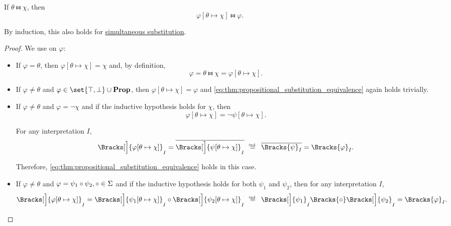 \begin{proposition}\label{thm:propositional_substitution_equivalence}
  If \( \theta \gleichstark \chi \), then
  \begin{equation}\label{eq:thm:propositional_substitution_equivalence}
    \varphi[\theta \mapsto \chi] \gleichstark \varphi.
  \end{equation}
\end{proposition}
\begin{comments}
  \item By induction, this also holds for \hyperref[def:propositional_substitution/simultaneous]{simultaneous substitution}.
\end{comments}
\begin{proof}
  We use  on \( \varphi \):

  \begin{itemize}
    \item If \( \varphi = \theta \), then \( \varphi[\theta \mapsto \chi] = \chi \) and, by definition,
    \begin{equation*}
      \varphi = \theta \gleichstark \chi = \varphi[\theta \mapsto \chi].
    \end{equation*}

    \item If \( \varphi \neq \theta \) and \( \varphi \in \set{ \top, \bot } \cup \boldop{Prop} \), then \( \varphi[\theta \mapsto \chi] = \varphi \) and \eqref{eq:thm:propositional_substitution_equivalence} again holds trivially.

    \item If \( \varphi \neq \theta \) and \( \varphi = \neg \chi \) and if the inductive hypothesis holds for \( \chi \), then
    \begin{equation*}
      \varphi[\theta \mapsto \chi] = \neg \psi[\theta \mapsto \chi].
    \end{equation*}

    For any interpretation \( I \),
    \begin{equation*}
      \Bracks[\Big]{ \varphi[\theta \mapsto \chi] }_I
      =
      \overline{\Bracks[\Big]{\psi[\theta \mapsto \chi] }_I}
      \reloset {\T{ind.}} =
      \overline{\Bracks{\psi}_I}
      =
      \Bracks{\varphi}_I.
    \end{equation*}

    Therefore, \eqref{eq:thm:propositional_substitution_equivalence} holds in this case.

    \item If \( \varphi \neq \theta \) and \( \varphi = \psi_1 \bincirc \psi_2, \bincirc \in \Sigma \) and if the inductive hypothesis holds for both \( \psi_1 \) and \( \psi_2 \), then for any interpretation \( I \),
    \begin{equation*}
      \Bracks[\Big]{ \varphi[\theta \mapsto \chi] }_I
      =
      \Bracks[\Big]{ \psi_1[\theta \mapsto \chi] }_I \bincirc \Bracks[\Big]{ \psi_2[\theta \mapsto \chi] }_I
      \reloset {\T{ind.}} =
      \Bracks[\Big]{\psi_1}_I \Bracks{\bincirc} \Bracks[\Big]{\psi_2}_I
      =
      \Bracks{\varphi}_I.
    \end{equation*}


\end{itemize}
\end{proof}
